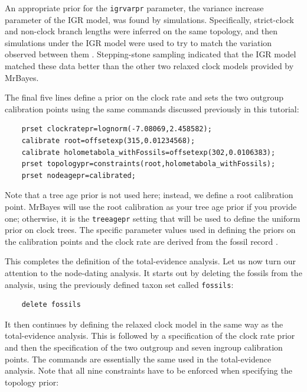 \documentclass[12pt]{book}
\newcommand{\ttt}[1]{\texttt{#1}}
\begin{document}
An appropriate prior for the \ttt{igrvarpr} parameter, the variance increase parameter of the IGR
model, was found by simulations. Specifically, strict-clock and non-clock branch lengths were
inferred on the same topology, and then simulations under the IGR model were used to try to match
the variation observed between them \citep{ronquist12b}. Stepping-stone sampling indicated that the
IGR model matched these data better than the other two relaxed clock models provided by MrBayes.

The final five lines define a prior on the clock rate and sets the two outgroup calibration points
using the same commands discussed previously in this tutorial:

\small
\begin{singlespacing}
\begin{verbatim}
    prset clockratepr=lognorm(-7.08069,2.458582);
    calibrate root=offsetexp(315,0.01234568);
    calibrate holometabola_withFossils=offsetexp(302,0.0106383);
    prset topologypr=constraints(root,holometabola_withFossils);
    prset nodeagepr=calibrated;
\end{verbatim}
\end{singlespacing}
\normalsize

Note that a tree age prior is not used here; instead, we define a root calibration point. MrBayes
will use the root calibration as your tree age prior if you provide one; otherwise, it is the
\ttt{treeagepr} setting that will be used to define the uniform prior on clock trees. The specific
parameter values used in defining the priors on the calibration points and the clock rate are
derived from the fossil record \citep{ronquist12b}.

This completes the definition of the total-evidence analysis. Let us now turn our attention to the
node-dating analysis. It starts out by deleting the fossils from the analysis, using the previously
defined taxon set called \ttt{fossils}:

\small
\begin{verbatim}
    delete fossils
\end{verbatim}
\normalsize

It then continues by defining the relaxed clock model in the same way as the total-evidence
analysis. This is followed by a specification of the clock rate prior and then the specification of
the two outgroup and seven ingroup calibration points. The commands are essentially the same used
in the total-evidence analysis. Note that all nine constraints have to be enforced when specifying
the topology prior:
\end{document}
